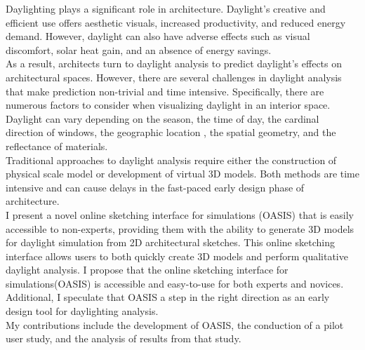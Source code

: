 Daylighting plays a significant role in architecture.
Daylight's creative and efficient use offers aesthetic visuals, increased productivity, and reduced energy demand. 
However, daylight can also have adverse effects such as visual discomfort, solar heat gain, and an absence of energy savings. \\

As a result, architects turn to daylight analysis to predict daylight's effects on architectural spaces. However, there are several challenges in daylight analysis that make prediction non-trivial and time intensive. Specifically, there are numerous factors to consider when visualizing daylight in an interior space. Daylight can vary depending on the season, the time of day, the cardinal direction of windows, the geographic location , the spatial geometry, and the reflectance of materials. \\

Traditional approaches to daylight analysis require either the construction of physical scale model or development of virtual 3D models. Both methods are time intensive and can cause delays in the fast-paced early design phase of architecture. \\

I present a novel online sketching interface for simulations (OASIS) that is easily accessible to non-experts, providing them with the ability to generate 3D models for daylight simulation from 2D architectural sketches. 
This online sketching interface allows users to both quickly create 3D models and perform qualitative daylight analysis.
I propose that the online sketching interface for simulations(OASIS) is accessible and easy-to-use for both experts and novices.
Additional, I speculate that OASIS a step in the right direction as an early design tool for daylighting analysis.\\

My contributions include the development of OASIS, the conduction of a pilot user study, and the analysis of results from that study. \\
